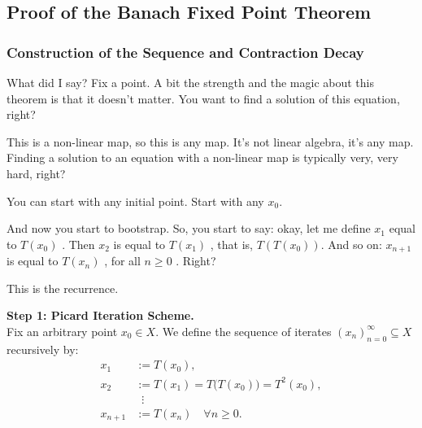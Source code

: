 \begin{hidden}
\end{hidden}

\subsection{Proof of the Banach Fixed Point Theorem}

\begin{proofWrapper}

\subsubsection{Construction of the Sequence and Contraction Decay}

\begin{speech}[00:25:05 - 00:26:36]
 What did I say? Fix a point. A bit the strength and the magic about this theorem is that it doesn't matter. You want to find a solution of this equation, right?

This is a non-linear map, so this is any map. It's not linear algebra, it's any map. Finding a solution to an equation with a non-linear map is typically very, very hard, right?

You can start with any initial point. Start with any $x_0$.

 And now you start to bootstrap. So, you start to say: okay, let me define $x_1$ equal to $T(x_0)$ . Then $x_2$ is equal to $T(x_1)$ , that is, $T(T(x_0))$. And so on: $x_{n+1}$ is equal to $T(x_n)$ , for all $n \ge 0$ . Right?

This is the recurrence. 
\end{speech}

\begin{content}
\textbf{Step 1: Picard Iteration Scheme.} \\
Fix an arbitrary point $x_0 \in X$. We define the sequence of iterates $(x_n)_{n=0}^\infty \subseteq X$ recursively by:
\begin{align}
x_1 &:= T(x_0), \nonumber \\
x_2 &:= T(x_1) = T\bigl(T(x_0)\bigr) = T^2(x_0), \nonumber \\
&\;\;\vdots \nonumber \\
x_{n+1} &:= T(x_n) \quad \forall n \ge 0. \label{eq:picard-iteration-recurrence}
\end{align}
\end{content}


\end{proofWrapper}
